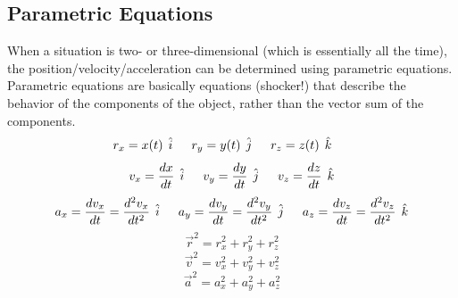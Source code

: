 \documentclass{article}
\begin{document}
	\subsection{Parametric Equations}
    	When a situation is two- or three-dimensional (which is essentially all the time), the position/velocity/acceleration can be determined using parametric equations. Parametric equations are basically equations (shocker!) that describe the behavior of the components of the object, rather than the vector sum of the components.
        \[
        	r_x=x(t) \hspace{1ex} \hat{i} \indent
            r_y=y(t) \hspace{1ex} \hat{j} \indent
            r_z=z(t) \hspace{1ex} \hat{k} \indent
        \]
        \[
        	v_x=\frac{dx}{dt} \hspace{1ex} \hat{i} \indent
            v_y=\frac{dy}{dt} \hspace{1ex} \hat{j} \indent
            v_z=\frac{dz}{dt} \hspace{1ex} \hat{k}
        \]
        \[
        	a_x=\frac{dv_x}{dt}=\frac{d^2v_x}{dt^2} \hspace{1ex} \hat{i} \indent
            a_y=\frac{dv_y}{dt}=\frac{d^2v_y}{dt^2} \hspace{1ex} \hat{j} \indent
            a_z=\frac{dv_z}{dt}=\frac{d^2v_z}{dt^2} \hspace{1ex} \hat{k}
        \]
        \[
        	\vec{r}^2=r_x^2+r_y^2+r_z^2
        \]
        \[
        	\vec{v}^2=v_x^2+v_y^2+v_z^2
        \]
        \[
        	\vec{a}^2=a_x^2+a_y^2+a_z^2
        \]
\end{document}
